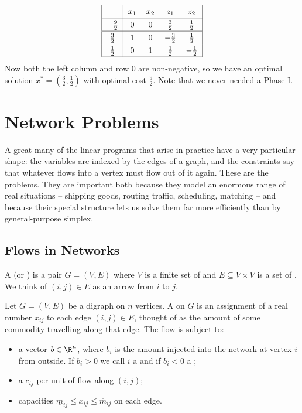 \documentclass[a4paper]{scrartcl}
\begin{document}
\begin{example}
    $$
    \arraycolsep=6pt\def\arraystretch{1.3}
    \begin{array}{|c|cccc|}\hline
        \multicolumn{1}{|c|}{} & x_1 & x_2 & z_1 & z_2\\\hline
        -\frac92 & 0 & 0 & \frac32 & \frac12\\\hline
        \frac32 & 1 & 0 & -\frac32 & \frac12\\
        \frac12 & 0 & 1 & \frac12 & -\frac12\\\hline
    \end{array}
    $$
    Now both the left column and row $0$ are non-negative, so we have an optimal solution $x^* = (\frac32, \frac12)$ with optimal cost $\frac92$. Note that we never needed a Phase I.
\end{example}

\section{Network Problems}

A great many of the linear programs that arise in practice have a very particular shape: the variables are indexed by the edges of a graph, and the constraints say that whatever flows into a vertex must flow out of it again. These are the  problems. They are important both because they model an enormous range of real situations -- shipping goods, routing traffic, scheduling, matching -- and because their special structure lets us solve them far more efficiently than by general-purpose simplex.

\subsection{Flows in Networks}

\begin{definition}
    A  (or ) is a pair $G = (V, E)$ where $V$ is a finite set of  and $E \subseteq V \times V$ is a set of . We think of $(i,j) \in E$ as an arrow from $i$ to $j$.
\end{definition}

\begin{definition}[Flow]
    Let $G = (V,E)$ be a digraph on $n$ vertices. A  on $G$ is an assignment of a real number $x_{ij}$ to each edge $(i,j) \in E$, thought of as the amount of some commodity travelling along that edge. The flow is subject to:
    \begin{itemize}
        \item a vector $b \in \R^n$, where $b_i$ is the amount injected into the network at vertex $i$ from outside. If $b_i > 0$ we call $i$ a  and if $b_i < 0$ a ;
        \item a  $c_{ij}$ per unit of flow along $(i,j)$;
        \item capacities $\underline m_{ij} \leq x_{ij} \leq \overline m_{ij}$ on each edge.
    \end{itemize}
\end{definition}
\end{document}
